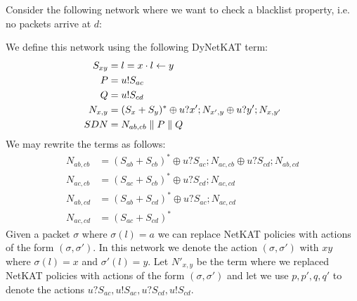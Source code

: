 \begin{example}
    Consider the following network where we want to check a blacklist
    property, i.e. no packets arrive at $d$:
    \begin{center}
    \end{center}
    We define this network using the following DyNetKAT term:
    \begin{align*}
        S_{xy}  & = l = x \cdot l \leftarrow y              \\
        P       & = u!S_{ac}                         \\
        Q       & = u!S_{cd}                         \\
        N_{x,y} & = (S_x+S_y)^* \oplus u?x';N_{x',y}
        \oplus u?y';N_{x,y'}                         \\
        SDN     & = N_{ab,cb} \parallel P \parallel Q
    \end{align*}
    We may rewrite the terms as follows:
    \begin{align*}
        N_{ab,cb} & = (S_{ab} + S_{cb})^* \oplus u?S_{ac};N_{ac,cb}
        \oplus u?S_{cd};N_{ab,cd}                                   \\
        N_{ac,cb} & = (S_{ac}+S_{cb})^* \oplus u?S_{cd};N_{ac,cd}   \\
        N_{ab,cd} & = (S_{ab}+S_{cd})^* \oplus u?S_{ac};N_{ac,cd}   \\
        N_{ac,cd} & = (S_{ac}+S_{cd})^*
    \end{align*}
    Given a packet $\sigma$ where $\sigma(l) = a$ we can replace NetKAT
    policies with actions of the form $(\sigma, \sigma')$.
    In this network we denote the action $(\sigma, \sigma')$
    with $xy$ where $\sigma(l) = x$ and $\sigma'(l) = y$.
    Let $N'_{x,y}$ be the term where we replaced NetKAT policies with
    actions of the form $(\sigma,\sigma')$ and let we use $p,p',q,q'$ to
    denote the actions $u?S_{ac},u!S_{ac},u?S_{cd},u!S_{cd}$.

\end{example}
